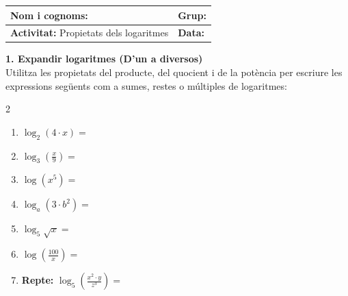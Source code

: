 \documentclass[12pt,a4paper]{article}
\begin{document}
\begingroup
\renewcommand{\arraystretch}{2.2}
\begin{tabularx}{\textwidth}{|X|p{4cm}|}
    \hline
    \textbf{Nom i cognoms:} & \textbf{Grup:} \\ \hline
    \textbf{Activitat:} Propietats dels logaritmes & \textbf{Data:} \\ \hline
\end{tabularx}
\endgroup

\vspace{0.8cm}


\textbf{1. Expandir logaritmes (D'un a diversos)} \\

Utilitza les propietats del producte, del quocient i de la potència per escriure les expressions següents com a sumes, restes o múltiples de logaritmes:

\begingroup
\setlength{\fboxsep}{10pt}
\noindent{}
\endgroup
\vspace{0.4cm}
\begin{multicols}{2}
\begin{enumerate}[label=\alph*)]
    \item $\log_2 (4 \cdot x) = $
    \item $\log_3 \left(\frac{x}{9}\right) = $
    \item $\log (x^5) = $
    \item $\log_a (3 \cdot b^2) = $
    \item $\log_5 \sqrt{x} = $ 
    \item $\log \left(\frac{100}{x}\right) = $
    \item \textbf{Repte:} $\log_5 \left(\frac{x^2 \cdot y}{z^3}\right) = $
\end{enumerate}
\end{multicols}

\vspace{0.3cm}
\end{document}
